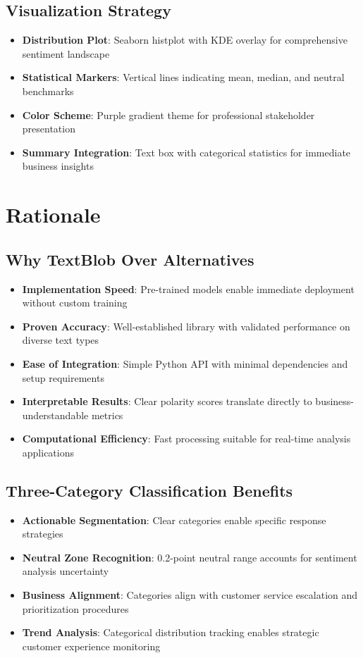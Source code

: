 \documentclass[11pt]{article}
\begin{document}
\subsection{Visualization Strategy}
\begin{itemize}
\item \textbf{Distribution Plot}: Seaborn histplot with KDE overlay for comprehensive sentiment landscape
\item \textbf{Statistical Markers}: Vertical lines indicating mean, median, and neutral benchmarks
\item \textbf{Color Scheme}: Purple gradient theme for professional stakeholder presentation
\item \textbf{Summary Integration}: Text box with categorical statistics for immediate business insights
\end{itemize}

\section{Rationale}

\subsection{Why TextBlob Over Alternatives}
\begin{itemize}
\item \textbf{Implementation Speed}: Pre-trained models enable immediate deployment without custom training
\item \textbf{Proven Accuracy}: Well-established library with validated performance on diverse text types
\item \textbf{Ease of Integration}: Simple Python API with minimal dependencies and setup requirements
\item \textbf{Interpretable Results}: Clear polarity scores translate directly to business-understandable metrics
\item \textbf{Computational Efficiency}: Fast processing suitable for real-time analysis applications
\end{itemize}

\subsection{Three-Category Classification Benefits}
\begin{itemize}
\item \textbf{Actionable Segmentation}: Clear categories enable specific response strategies
\item \textbf{Neutral Zone Recognition}: 0.2-point neutral range accounts for sentiment analysis uncertainty
\item \textbf{Business Alignment}: Categories align with customer service escalation and prioritization procedures
\item \textbf{Trend Analysis}: Categorical distribution tracking enables strategic customer experience monitoring
\end{itemize}
\end{document}
